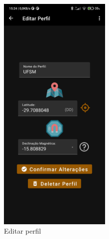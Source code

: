 \begin{figure}[H]
	\centering
	\caption{Telas de perfis}
	\label{telasperfis}
	\begin{subfigure}[b]{0.4\textwidth}
		\centering
		\includegraphics[width=0.6\textwidth]{figuras/desAplicativo/edit}
		\caption{Editar perfil}
		\label{edit}
	\end{subfigure}
	\hfill
	\begin{subfigure}[b]{0.4\textwidth}
		\centering

\end{subfigure}
\end{figure}
